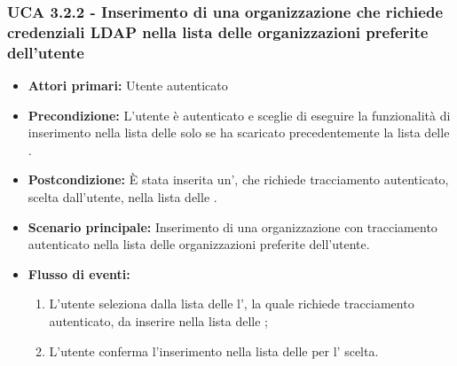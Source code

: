 \subsubsection{UCA 3.2.2 - Inserimento di una organizzazione che richiede credenziali LDAP nella lista delle organizzazioni preferite dell'utente}%
\begin{itemize}
	\item \textbf{Attori primari:} Utente autenticato
	\item \textbf{Precondizione:} L'utente è autenticato e sceglie di eseguire la funzionalità di inserimento nella lista delle  solo se ha scaricato precedentemente la lista delle .
	\item \textbf{Postcondizione:} È stata inserita un', che richiede tracciamento autenticato, scelta dall'utente, nella lista delle .
	\item \textbf{Scenario principale:} Inserimento di una organizzazione con tracciamento autenticato nella lista delle organizzazioni preferite dell'utente.
	\item \textbf{Flusso di eventi:}
	\begin{enumerate}
		\item L'utente seleziona dalla lista delle  l', la quale richiede tracciamento autenticato, da inserire nella lista delle ;
		\item L'utente conferma l'inserimento nella lista delle  per l' scelta.
	\end{enumerate}
\end{itemize}

